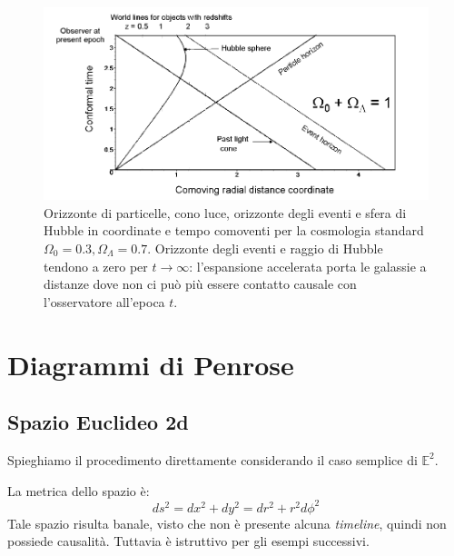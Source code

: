 \begin{figure}
    \centering
    \includegraphics[scale=0.4]{immagini/lcdm_causaleconforme.png}
    \caption{Orizzonte di particelle, cono luce, orizzonte degli eventi e sfera di Hubble  in coordinate e tempo comoventi per la cosmologia standard $\Omega_0 = 0.3, \Omega_\Lambda = 0.7$. Orizzonte degli eventi e raggio di Hubble tendono a zero per $t\rightarrow \infty$: l'espansione accelerata porta le galassie a distanze dove non ci può più essere contatto causale con l'osservatore all'epoca $t$.}
    \label{fig.lcdm_causale}
\end{figure}
\section{Diagrammi di Penrose}
\subsection{Spazio Euclideo 2d}
Spieghiamo il procedimento direttamente considerando il caso semplice di $\mathbb{E}^2$.

La metrica dello spazio è:
\begin{equation*}
    ds^2 = dx^2 + dy^2 = dr^2 + r^2d\phi^2
\end{equation*}
Tale spazio risulta banale, visto che non è presente alcuna \emph{timeline}, quindi non possiede causalità. Tuttavia è istruttivo per gli esempi successivi.

